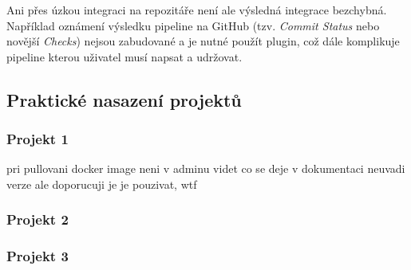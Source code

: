         Ani přes úzkou integraci na repozitáře není ale výsledná integrace bezchybná. Například oznámení výsledku pipeline na GitHub (tzv. \textit{Commit Status} nebo novější \textit{Checks}) nejsou zabudované a je nutné použít plugin, což dále komplikuje pipeline kterou uživatel musí napsat a udržovat.

        \blind[1]

    \subsection{Praktické nasazení projektů}
        \subsubsection{Projekt 1}
            pri pullovani docker image neni v adminu videt co se deje
            v dokumentaci neuvadi verze ale doporucuji je je pouzivat, wtf
            \blind[2]

        \subsubsection{Projekt 2}
            \blind[2]

        \subsubsection{Projekt 3}
            \blind[2]
